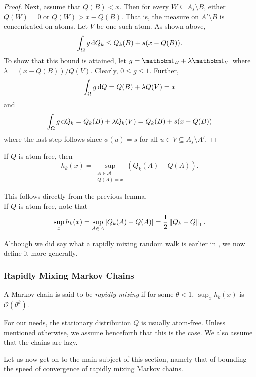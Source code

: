 \begin{proof}
	Next, assume that $Q(B)<x$. Then for every $W\subseteq A_s\setminus B$, either $Q(W)=0$ or $Q(W)>x-Q(B)$. That is, the measure on $A'\setminus B$ is concentrated on atoms. Let $V$ be one such atom. As shown above,
	\[ \int_\Omega g\operatorname{d}\!{Q}_k \leq Q_k(B) + s(x-Q(B)). \]
	To show that this bound is attained, let $g=\indic_B+\lambda\indic_{V}$ where $\lambda = (x-Q(B))/Q(V)$. Clearly, $0\leq g\leq 1$. Further,
	\[ \int_\Omega g\operatorname{d}\!{Q} = Q(B) + \lambda Q(V) = x \]
	and
	\[ \int_\Omega g\operatorname{d}\!{Q}_k = Q_k(B)+\lambda Q_k(V) = Q_k(B) + s(x-Q(B)) \]
	where the last step follows since $\phi(u)=s$ for all $u\in V\subseteq A_s\setminus A'$.
\end{proof}

\begin{lemma}
	If $Q$ is atom-free, then
	\[ h_k(x) = \sup_{\substack{A\in\mathcal{A} \\ Q(A)=x}} \left(Q_k(A) - Q(A)\right). \]
\end{lemma}

This follows directly from the previous lemma.\\
If $Q$ is atom-free, note that
\begin{equation}
	\label{eqn: hk and one norm}
	\sup_{x} h_k(x) = \sup_{A\in\mathcal{A}} |Q_k(A) - Q(A)| = \frac{1}{2}\left\lVert Q_k - Q\right\rVert_1.
\end{equation}

Although we did say what a rapidly mixing random walk is earlier in , we now define it more generally.\\

\subsubsection{Rapidly Mixing Markov Chains}

\begin{fdef}
A Markov chain is said to be \textit{rapidly mixing} if for some $\theta<1$, $\sup_x h_k(x)$ is $\mathcal{O}(\theta^k)$.
\end{fdef}

For our needs, the stationary distribution $Q$ is usually atom-free. Unless mentioned otherwise, we assume henceforth that this is the case. We also assume that the chains are lazy.

Let us now get on to the main subject of this section, namely that of bounding the speed of convergence of rapidly mixing Markov chains.

